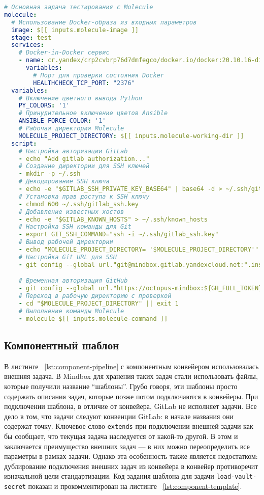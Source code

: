 \begin{lstlisting}[language=yaml,label={lst:component-pipeline}]
# Основная задача тестирования с Molecule
molecule:
  # Использование Docker-образа из входных параметров
  image: $[[ inputs.molecule-image ]]
  stage: test
  services:
    # Docker-in-Docker сервис
    - name: cr.yandex/crp2cvbrp76d7dmfegco/docker.io/docker:20.10.16-dind
      variables:
        # Порт для проверки состояния Docker
        HEALTHCHECK_TCP_PORT: "2376"
  variables:
    # Включение цветного вывода Python
    PY_COLORS: '1'
    # Принудительное включение цветов Ansible
    ANSIBLE_FORCE_COLOR: '1'
    # Рабочая директория Molecule
    MOLECULE_PROJECT_DIRECTORY: $[[ inputs.molecule-working-dir ]]
  script:
    # Настройка авторизации GitLab
    - echo "Add gitlab authorization..."
    # Создание директории для SSH ключей
    - mkdir -p ~/.ssh
    # Декодирование SSH ключа
    - echo -e "$GITLAB_SSH_PRIVATE_KEY_BASE64" | base64 -d > ~/.ssh/gitlab_ssh.key
    # Установка прав доступа к SSH ключу
    - chmod 600 ~/.ssh/gitlab_ssh.key
    # Добавление известных хостов
    - echo -e "$GITLAB_KNOWN_HOSTS" > ~/.ssh/known_hosts
    # Настройка SSH команды для Git
    - export GIT_SSH_COMMAND="ssh -i ~/.ssh/gitlab_ssh.key"
    # Вывод рабочей директории
    - echo "MOLECULE_PROJECT_DIRECTORY= '$MOLECULE_PROJECT_DIRECTORY'"
    # Настройка Git URL для SSH
    - git config --global url."git@mindbox.gitlab.yandexcloud.net:".insteadOf "https://mindbox.gitlab.yandexcloud.net/"

    # Временная авторизация GitHub
    - git config --global url."https://octopus-mindbox:${GH_FULL_TOKEN}@github.com/mindbox-cloud".insteadOf "https://github.com/mindbox-cloud"
    # Переход в рабочую директорию с проверкой
    - cd "$MOLECULE_PROJECT_DIRECTORY" || exit 1
    # Выполнение команды Molecule
    - molecule $[[ inputs.molecule-command ]]
\end{lstlisting}

\subsection{Компонентный шаблон} \label{subsec:component-template}
В листинге ~\ref{lst:component-pipeline} с компонентным конвейером использовалась внешняя задача.
В Mindbox для хранения таких задач стали использовать файлы, которые получили название \enquote{шаблоны}.
Грубо говоря, эти шаблоны просто содержать описания задач, которые позже потом подключаются в конвейеры.
При подключении шаблона, в отличие от конвейера, GitLab не исполняет задачи.
Все дело в том, что задачи следуют конвенции GitLab: в начале названия они содержат точку.
Ключевое слово \texttt{extends} при подключении внешней задачи как бы сообщает, что текущая задача наследуется от какой-то другой.
В этом и заключается преимущество внешних задач — в них можно переопределить все параметры в рамках задачи.
Однако эта особенность также является недостатком:
дублирование подключения внешних задач из конвейера в конвейер противоречит изначальной цели стандартизации.
Код задания шаблона для задачи \texttt{load-vault-secret} показан и прокомментирован на листинге ~\ref{lst:component-template}.

